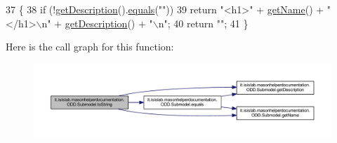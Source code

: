 \begin{DoxyCode}
37                             \{
38         \textcolor{keywordflow}{if} (!\hyperlink{classit_1_1isislab_1_1masonhelperdocumentation_1_1_o_d_d_1_1_submodel_ac22c78907427d00f274530347f035149}{getDescription}().\hyperlink{classit_1_1isislab_1_1masonhelperdocumentation_1_1_o_d_d_1_1_submodel_a2bb03f7d258a5e882219eaf7dd3b8257}{equals}(\textcolor{stringliteral}{""}))
39             \textcolor{keywordflow}{return} \textcolor{stringliteral}{"<h1>"} + \hyperlink{classit_1_1isislab_1_1masonhelperdocumentation_1_1_o_d_d_1_1_submodel_a25ea4ffe85d1b3ce42d22160e573cb50}{getName}() + \textcolor{stringliteral}{"</h1>\(\backslash\)n"} + \hyperlink{classit_1_1isislab_1_1masonhelperdocumentation_1_1_o_d_d_1_1_submodel_ac22c78907427d00f274530347f035149}{getDescription}() + \textcolor{stringliteral}{"\(\backslash\)n"};
40         \textcolor{keywordflow}{return} \textcolor{stringliteral}{""};
41     \}
\end{DoxyCode}


Here is the call graph for this function\-:\nopagebreak
\begin{figure}[H]
\begin{center}
\leavevmode
\includegraphics[width=350pt]{classit_1_1isislab_1_1masonhelperdocumentation_1_1_o_d_d_1_1_submodel_ab71b66743f9c7314f3e5ec16dccf9173_cgraph}
\end{center}
\end{figure}




